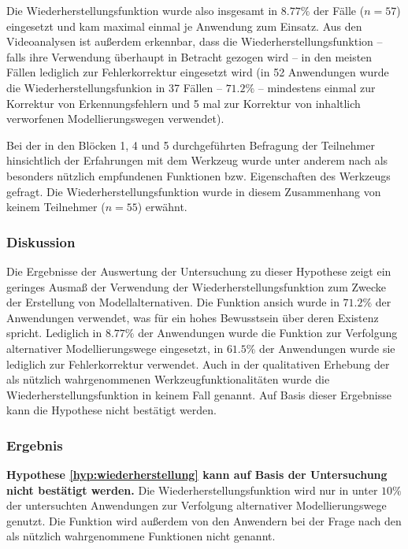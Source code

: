 Die Wiederherstellungsfunktion wurde also insgesamt in $8.77\%$ der Fälle ($n=57$) eingesetzt und kam maximal einmal je Anwendung zum Einsatz.  Aus den Videoanalysen ist außerdem erkennbar, dass die Wiederherstellungsfunktion -- falls ihre Verwendung überhaupt in Betracht gezogen wird -- in den meisten Fällen lediglich zur Fehlerkorrektur eingesetzt wird (in 52 Anwendungen wurde die Wiederherstellungsfunkion in 37 Fällen -- $71.2\%$ -- mindestens einmal zur Korrektur von Erkennungsfehlern und 5 mal zur Korrektur von inhaltlich verworfenen Modellierungswegen verwendet).

Bei der in den Blöcken 1, 4 und 5 durchgeführten Befragung der Teilnehmer hinsichtlich der Erfahrungen mit dem Werkzeug wurde unter anderem nach als besonders nützlich empfundenen Funktionen bzw. Eigenschaften des Werkzeugs gefragt. Die Wiederherstellungsfunktion wurde in diesem Zusammenhang von keinem Teilnehmer ($n=55$) erwähnt. 

\subsubsection{Diskussion} 

Die Ergebnisse der Auswertung der Untersuchung zu dieser Hypothese zeigt ein geringes Ausmaß der Verwendung der Wiederherstellungsfunktion zum Zwecke der Erstellung von Modellalternativen. Die Funktion ansich wurde in $71.2\%$ der Anwendungen verwendet, was für ein hohes Bewusstsein über deren Existenz spricht. Lediglich in $8.77\%$ der Anwendungen wurde die Funktion zur Verfolgung alternativer Modellierungswege eingesetzt, in $61.5\%$ der Anwendungen wurde sie lediglich zur Fehlerkorrektur verwendet. Auch in der qualitativen Erhebung der als nützlich wahrgenommenen Werkzeugfunktionalitäten wurde die Wiederherstellungsfunktion in keinem Fall genannt. Auf Basis dieser Ergebnisse kann die Hypothese nicht bestätigt werden. 

\subsubsection{Ergebnis} 

\textbf{Hypothese \ref{hyp:wiederherstellung} kann auf Basis der Untersuchung nicht bestätigt werden.} Die Wiederherstellungsfunktion wird nur in unter $10\%$ der untersuchten Anwendungen  zur Verfolgung alternativer Modellierungswege genutzt. Die Funktion wird außerdem von den Anwendern bei der Frage nach den als nützlich wahrgenommene Funktionen nicht genannt.

